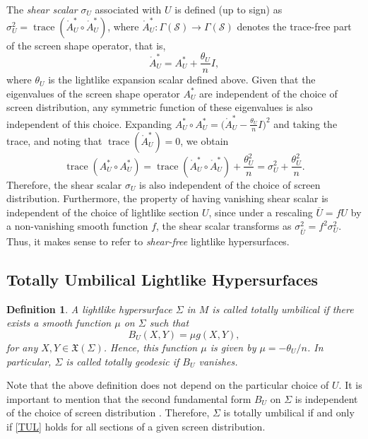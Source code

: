 \documentclass[11pt]{article}
\numberwithin{equation}{section}
\newtheorem{definition}[theorem]{Definition}
\begin{document}
The \emph{shear scalar} $\sigma_U$ associated with $U$ is defined (up to sign) as $\sigma_U^2 = \operatorname{trace}(\mathring{A}^*_U \circ \mathring{A}^*_U)$, where $\mathring{A}^*_U\colon \Gamma(\mathcal{S}) \to \Gamma(\mathcal{S})$ denotes the trace-free part of the screen shape operator, that is,
\begin{equation}\label{LightlikeShear1}
	\mathring{A}^*_U = A^*_U + \frac{\theta_U}{n} I,
\end{equation}
where $\theta_U$ is the lightlike expansion scalar defined above. Given that the eigenvalues of the screen shape operator $A^*_U$ are independent of the choice of screen distribution, any symmetric function of these eigenvalues is also independent of this choice. Expanding $A^*_U \circ A^*_U = \bigl(\mathring{A}^*_U - \frac{\theta_U}{n} I\bigr)^2$ and taking the trace, and noting that $\operatorname{trace}(\mathring{A}^*_U) = 0$, we obtain
\[
\operatorname{trace}(A^*_U \circ A^*_U) = \operatorname{trace}(\mathring{A}^*_U \circ \mathring{A}^*_U) + \frac{\theta_U^2}{n} = \sigma_U^2 + \frac{\theta_U^2}{n}.
\]
Therefore, the shear scalar $\sigma_U$ is also independent of the choice of screen distribution.  Furthermore, the property of having vanishing shear scalar is independent of the choice of lightlike section $U$, since under a rescaling $\overline{U} = fU$ by a non-vanishing smooth function $f$, the shear scalar transforms as $\sigma^2_{\overline{U}} = f^2 \sigma^2_U$. Thus, it makes sense to refer to \emph{shear-free} lightlike hypersurfaces.
	
	\subsection{Totally Umbilical Lightlike Hypersurfaces}
	\begin{definition}\normalfont \cite{Bejancu1996}
		A lightlike hypersurface $\Sigma$ in $M$ is called \emph{totally umbilical} if there exists a smooth function $\mu$ on $\Sigma$ such that 
		\begin{equation} \label{TUL}
			B_U(X,Y)=\mu g(X,Y),
		\end{equation}
		for any $X, Y\in {\mathfrak X}(\Sigma)$. Hence, this function $\mu$ is given by $\mu=-\theta_U/n$. In particular, $\Sigma$ is called \emph{totally geodesic} if $B_U$ vanishes.
	\end{definition}
	
	Note that the above definition does not depend on the particular choice of $U$. It is important to mention that the second fundamental form $B_U$ on $\Sigma$ is independent of the
	choice of screen distribution \cite[Prop.~2.1]{Bejancu1996}. Therefore, $\Sigma$ is totally umbilical if and only if \eqref{TUL} holds for all sections of a given screen distribution.
	
\end{document}
